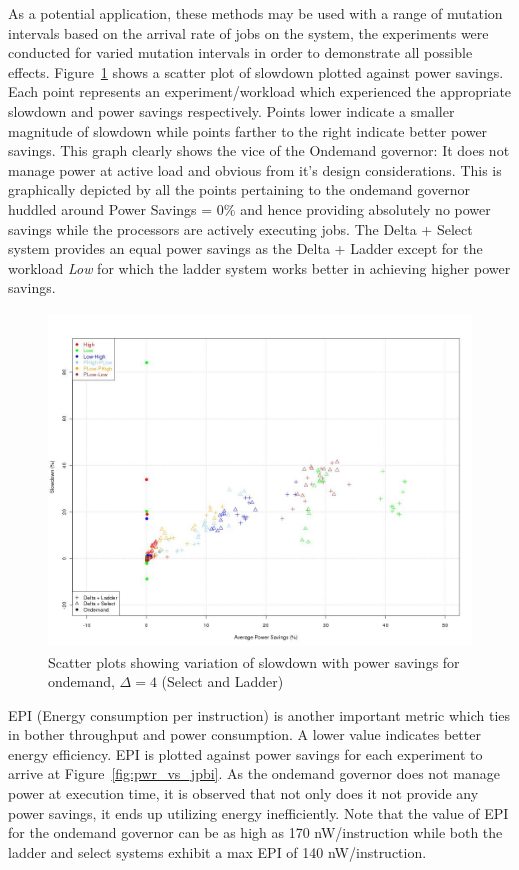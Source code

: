 As a potential application, these methods may be used with a range of mutation intervals based
on the arrival rate of jobs on the system, the experiments were conducted for varied mutation intervals
in order to demonstrate all possible effects.
Figure~\ref{fig:pwr_vs_slowdown} shows a scatter plot of slowdown plotted against power savings. Each point
represents an experiment/workload which experienced the appropriate slowdown and power savings respectively. 
Points lower indicate a smaller magnitude of slowdown while points farther to the right indicate better power
savings. This graph clearly shows the vice of the Ondemand governor: It does not manage power at active
load and obvious from it's design considerations. This is graphically depicted by all the points pertaining
to the ondemand governor huddled around Power Savings = 0\% and hence providing absolutely no power savings
while the processors are actively executing jobs. The Delta + Select system provides an equal power savings
as the Delta + Ladder except for the workload \textit{Low} for which the ladder system works better in achieving
higher power savings.

\begin{figure}[h!]
  \begin{center}
    \includegraphics[height=3.5in]{figures/pwr_vs_slowdown_delta_4.jpg}%
    \caption{Scatter plots showing variation of slowdown with power savings for ondemand, $\Delta=4$ (Select and Ladder)}
    \label{fig:pwr_vs_slowdown}
  \end{center}
\end{figure}

EPI (Energy consumption per instruction) is another important metric which ties in bother throughput and power
consumption. A lower value indicates better energy efficiency. EPI is plotted 
against power savings for each experiment to arrive at Figure~\ref{fig:pwr_vs_jpbi}. As the ondemand governor
does not manage power at execution time, it is observed that not only does it not provide any power savings, 
it ends up utilizing energy inefficiently. Note that the value of EPI for the ondemand governor can be as high
as 170 nW/instruction while both the ladder and select systems exhibit a max EPI of 140 nW/instruction.

